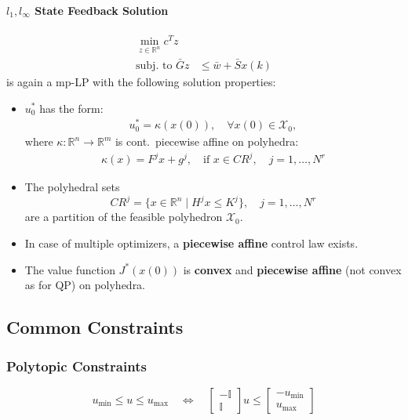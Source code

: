 \paragraph[l1, linf State Feedback Solution]{$l_{1}, l_{\infty}$ State Feedback Solution}
\noindent
\begin{align*}
    \min_{z\in\mathbb{R}^n}c^T z                            \\
    \text{subj.\ to } \bar{G}z & \leq \bar{w} + \bar{S}x(k)
\end{align*}
is again a mp-LP with the following solution properties:
\begin{itemize}
    \item $u_0^*$ has the form:
          \begin{align*}
              u_0^* = \kappa(x(0)), \quad \forall x(0) \in \mathcal{X}_0,
          \end{align*}
          where $\kappa : \mathbb{R}^n \to \mathbb{R}^m$ is cont.\, piecewise affine on polyhedra:
          \begin{align*}
              \kappa(x) = F^j x + g^j, \quad \text{if } x \in CR^j, \quad j = 1, \dots, N^r
          \end{align*}
    \item The polyhedral sets
          \begin{equation*}
              CR^j = \{x \in \mathbb{R}^n \mid H^j x \leq K^j\}, \quad j = 1, \dots, N^r
          \end{equation*}
          are a partition of the feasible polyhedron $\mathcal{X}_0$.
    \item In case of multiple optimizers, a \textbf{piecewise affine} control law exists.
    \item The value function $J^*(x(0))$ is \textbf{convex} and \textbf{piecewise affine} (not convex as for QP) on polyhedra.
\end{itemize}

\subsection{Common Constraints}
\subsubsection{Polytopic Constraints}
\begin{equation*}
    u_{\min} \leq u \leq u_{\max} \quad \Leftrightarrow \quad \begin{bmatrix}
        -\mathbb{I} \\
        \mathbb{I}
    \end{bmatrix} u \leq \begin{bmatrix}
        -u_{\min} \\
        u_{\max}
    \end{bmatrix}
\end{equation*}

